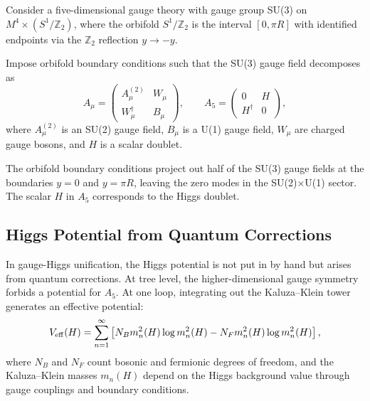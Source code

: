 \begin{hypothesis}
\label{hyp:su3-electroweak-unification}
Consider a five-dimensional gauge theory with gauge group SU(3) on
\(M^4 \times (S^1/\mathbb{Z}_2)\), where the orbifold \(S^1/\mathbb{Z}_2\) is the
interval \([0, \pi R]\) with identified endpoints via the \(\mathbb{Z}_2\)
reflection \(y \to -y\).

Impose orbifold boundary conditions such that the SU(3) gauge field decomposes as
\begin{equation}
  A_\mu = \begin{pmatrix}
  A_\mu^{(2)} & W_\mu \\
  W_\mu^\dagger & B_\mu
  \end{pmatrix},
  \qquad
  A_5 = \begin{pmatrix}
  0 & H \\
  H^\dagger & 0
  \end{pmatrix},
  \label{eq:su3-decomposition}
\end{equation}
where \(A_\mu^{(2)}\) is an SU(2) gauge field, \(B_\mu\) is a U(1) gauge field,
\(W_\mu\) are charged gauge bosons, and \(H\) is a scalar doublet.
\end{hypothesis}

The orbifold boundary conditions project out half of the SU(3) gauge fields at the
boundaries \(y=0\) and \(y=\pi R\), leaving the zero modes in the SU(2)\(\times\)U(1)
sector.  The scalar \(H\) in \(A_5\) corresponds to the Higgs doublet.

\subsection{Higgs Potential from Quantum Corrections}

In gauge-Higgs unification, the Higgs potential is not put in by hand but arises
from quantum corrections.  At tree level, the higher-dimensional gauge symmetry
forbids a potential for \(A_5\).  At one loop, integrating out the Kaluza--Klein
tower generates an effective potential:
\begin{equation}
  V_{\rm eff}(H) = \sum_{n=1}^\infty \left[ N_B m_n^2(H) \log m_n^2(H)
  - N_F m_n^2(H) \log m_n^2(H) \right],
  \label{eq:higgs-effective-potential}
\end{equation}
where \(N_B\) and \(N_F\) count bosonic and fermionic degrees of freedom, and the
Kaluza--Klein masses \(m_n(H)\) depend on the Higgs background value through gauge
couplings and boundary conditions.

